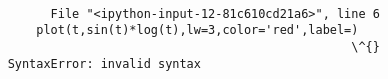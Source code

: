 \documentclass[11pt]{article}
\begin{document}
    \begin{Verbatim}[commandchars=\\\{\}]

          File "<ipython-input-12-81c610cd21a6>", line 6
        plot(t,sin(t)*log(t),lw=3,color='red',label=)
                                                    \^{}
    SyntaxError: invalid syntax


    \end{Verbatim}


    
    
    
    
\end{document}
